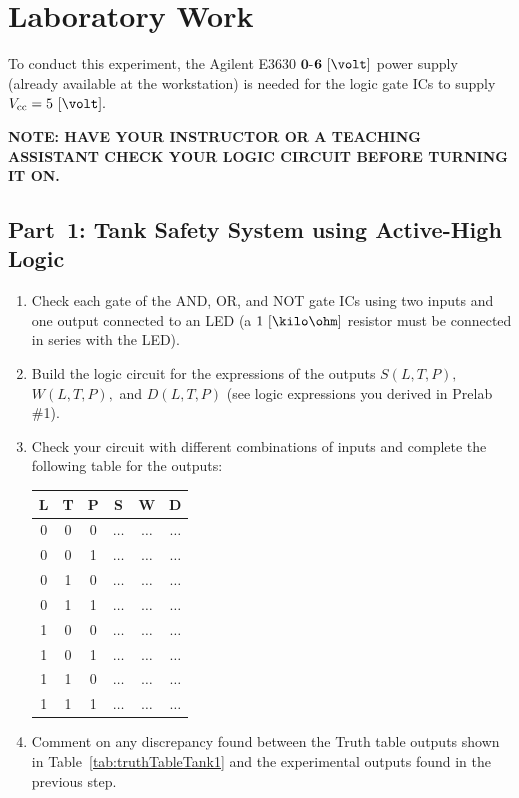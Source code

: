 \section{Laboratory Work}
To conduct this experiment, the Agilent E3630 $\mathbf{0}$-$\mathbf{6}~[\volt]$ power supply (already available at the workstation) is needed for the logic gate ICs to supply  $V_{\mathrm{cc}} = 5~[\volt].$ 

\begin{mdframed}
  {\bf NOTE: HAVE YOUR INSTRUCTOR OR A TEACHING ASSISTANT CHECK YOUR LOGIC CIRCUIT BEFORE TURNING IT ON.}  
\end{mdframed}


\subsection{Part~1: Tank Safety System using Active-High Logic}
\label{sec:part1}


\begin{enumerate}
\item Check each gate of the AND, OR, and NOT gate ICs using two inputs and one output connected to an LED (a $1~[\kilo\ohm]$ resistor must be connected in series with the LED).
  
\item Build the logic circuit for the expressions of the outputs $S(L,T,P),$ $W(L,T,P),$ and $D(L,T,P)$ (see logic expressions you derived  in Prelab \#1).
  
\item Check your circuit with different combinations of inputs and complete the following table for the outputs:

  \begin{center}
  \begin{tabular}{ccc|c|c|c}
    \toprule
    L & T & P & S & W & D\\
    \toprule
    0 & 0 & 0 & $\ldots$ & $\ldots$ &  $\ldots$\\
    0 & 0 & 1 & $\ldots$ & $\ldots$ &  $\ldots$\\ 
    0 & 1 & 0 & $\ldots$ & $\ldots$ &  $\ldots$\\ 
    0 & 1 & 1 & $\ldots$ & $\ldots$ &  $\ldots$\\ 
    1 & 0 & 0 & $\ldots$ & $\ldots$ &  $\ldots$\\ 
    1 & 0 & 1 & $\ldots$ & $\ldots$ &  $\ldots$\\ 
    1 & 1 & 0 & $\ldots$ & $\ldots$ &  $\ldots$\\ 
    1 & 1 & 1 & $\ldots$ & $\ldots$ &  $\ldots$\\ 
    \bottomrule
  \end{tabular}
\end{center}

\item Comment on any discrepancy found between the Truth table  outputs shown in Table~\ref{tab:truthTableTank1} and the experimental outputs found in the previous step. 
\end{enumerate}


